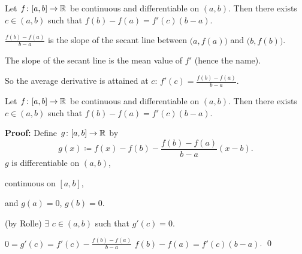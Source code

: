 \documentclass[10pt,aspectratio=149]{beamer}
\begin{document}
\begin{frame}

\begin{theorem}
Let $f \colon [a,b] \to {\mathbb{R}}$ be continuous and
differentiable on $(a,b)$.  Then there exists $c \in (a,b)$
such that \quad
$f(b)-f(a) = f'(c)(b-a)$.
\end{theorem}

\pause
\begin{center}
\end{center}

\pause
$\frac{f(b)-f(a)}{b-a}$
is the slope of the secant line between $\bigl(a,f(a)\bigr)$ and $\bigl(b,f(b)\bigr)$.

\pause
\medskip

The slope of the secant line is the mean value of $f'$ (hence the name).

\pause
\medskip

So the average derivative is attained at $c$:
\quad
$f'(c)=\frac{f(b)-f(a)}{b-a}$.
\end{frame}

\begin{frame}
\begin{theorem}
Let $f \colon [a,b] \to {\mathbb{R}}$ be continuous and
differentiable on $(a,b)$.  Then there exists $c \in (a,b)$
such that \quad
$f(b)-f(a) = f'(c)(b-a)$.
\end{theorem}

\pause
\textbf{Proof:}
Define 
$g \colon [a,b] \to {\mathbb{R}}$ by
\begin{equation*}
g(x) \coloneqq f(x)-f(b)-\frac{f(b)-f(a)}{b-a}(x-b) .
\end{equation*}
\pause
$g$ is differentiable on $(a,b)$,

\pause
continuous on $[a,b]$,

\pause
and $g(a) = 0$, $g(b) = 0$.

\pause
\medskip

\thus \quad (by Rolle) $\exists$
$c \in (a,b)$ such that $g'(c) = 0$.

\pause
\medskip

$0 = g'(c) = f'(c)-\frac{f(b)-f(a)}{b-a}$
\pause
\quad
{}
\quad
$f(b)-f(a) = f'(c)(b-a)$.
\qed

\end{frame}
\end{document}
